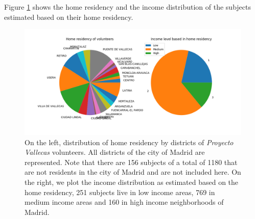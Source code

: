 \documentclass[11pt]{article}
\theoremstyle{definition}
\theoremstyle{remark}
\begin{document}
Figure \ref{fig:incomeresidency} shows the home residency and the income distribution of the subjects estimated based on their home residency. 

\begin{figure}[H]
        \centering
        \includegraphics[keepaspectratio, width=.8\linewidth]{figures/incomeresidency}
        \caption{On the left, distribution of home residency by districts of \emph{Proyecto Vallecas} volunteers. All districts of the city of Madrid are represented. Note that there are 156 subjects of a total of 1180 that are not residents in the city of Madrid and are not included here. On the right, we plot the income distribution as estimated based on the home residency, 251 subjects live in low income areas, 769 in medium income areas and 160 in high income neighborhoods of Madrid.
        } \label{fig:incomeresidency}
\end{figure}

\end{document}
